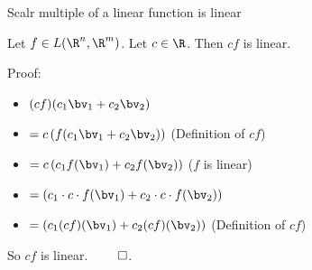 \documentclass{beamer}
\begin{document}
\begin{frame}{Scalr multiple of a linear function is linear}

\begin{lemma}
Let $f\in L(\R^n, \R^m)$. Let $c\in\R$. Then $c f$ is linear.
\end{lemma}

\pause

Proof:

\pause

\begin{itemize}
\item $(c f)(c_1 \bv_1 + c_2 \bv_2)$
\item $=c \left (f(c_1 \bv_1 + c_2 \bv_2) \right )$ \quad (Definition of $c f$)
\item $= c \left(c_1 f(\bv_1) + c_2 f(\bv_2)  \right)$ \quad ($f$ is linear)
\item $= \left(c_1 \cdot c \cdot f(\bv_1) + c_2 \cdot c \cdot f(\bv_2)  \right)$
\item $= \left(c_1 (c f)(\bv_1) + c_2 (c f)(\bv_2)  \right)$ \quad (Definition of $c f$)
\end{itemize}

\pause

So $c f$ is linear. $\qed$.

\end{frame}
\end{document}
